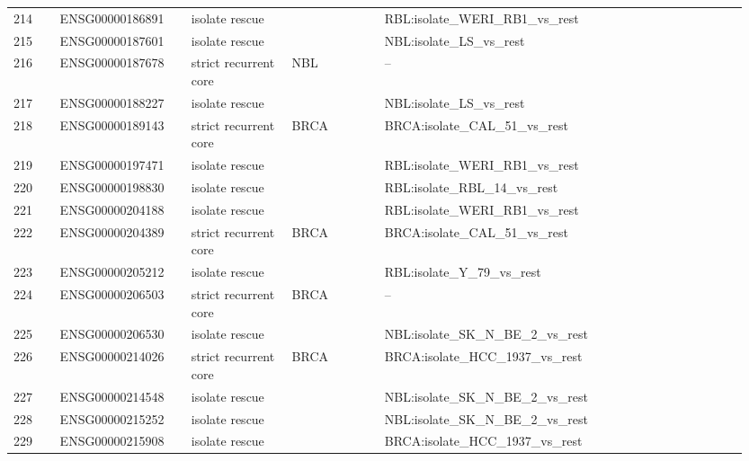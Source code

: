 \begin{landscape}
{\begin{longtable}{p{0.06\linewidth}p{0.17\linewidth}p{0.13\linewidth}p{0.12\linewidth}p{0.47\linewidth}}
214 & ENSG00000186891 & isolate rescue &  & RBL:isolate\_\allowbreak{}WERI\_\allowbreak{}RB1\_\allowbreak{}vs\_\allowbreak{}rest \\
215 & ENSG00000187601 & isolate rescue &  & NBL:isolate\_\allowbreak{}LS\_\allowbreak{}vs\_\allowbreak{}rest \\
216 & ENSG00000187678 & strict recurrent core & NBL & -- \\
217 & ENSG00000188227 & isolate rescue &  & NBL:isolate\_\allowbreak{}LS\_\allowbreak{}vs\_\allowbreak{}rest \\
218 & ENSG00000189143 & strict recurrent core & BRCA & BRCA:isolate\_\allowbreak{}CAL\_\allowbreak{}51\_\allowbreak{}vs\_\allowbreak{}rest \\
219 & ENSG00000197471 & isolate rescue &  & RBL:isolate\_\allowbreak{}WERI\_\allowbreak{}RB1\_\allowbreak{}vs\_\allowbreak{}rest \\
220 & ENSG00000198830 & isolate rescue &  & RBL:isolate\_\allowbreak{}RBL\_\allowbreak{}14\_\allowbreak{}vs\_\allowbreak{}rest \\
221 & ENSG00000204188 & isolate rescue &  & RBL:isolate\_\allowbreak{}WERI\_\allowbreak{}RB1\_\allowbreak{}vs\_\allowbreak{}rest \\
222 & ENSG00000204389 & strict recurrent core & BRCA & BRCA:isolate\_\allowbreak{}CAL\_\allowbreak{}51\_\allowbreak{}vs\_\allowbreak{}rest \\
223 & ENSG00000205212 & isolate rescue &  & RBL:isolate\_\allowbreak{}Y\_\allowbreak{}79\_\allowbreak{}vs\_\allowbreak{}rest \\
224 & ENSG00000206503 & strict recurrent core & BRCA & -- \\
225 & ENSG00000206530 & isolate rescue &  & NBL:isolate\_\allowbreak{}SK\_\allowbreak{}N\_\allowbreak{}BE\_\allowbreak{}2\_\allowbreak{}vs\_\allowbreak{}rest \\
226 & ENSG00000214026 & strict recurrent core & BRCA & BRCA:isolate\_\allowbreak{}HCC\_\allowbreak{}1937\_\allowbreak{}vs\_\allowbreak{}rest \\
227 & ENSG00000214548 & isolate rescue &  & NBL:isolate\_\allowbreak{}SK\_\allowbreak{}N\_\allowbreak{}BE\_\allowbreak{}2\_\allowbreak{}vs\_\allowbreak{}rest \\
228 & ENSG00000215252 & isolate rescue &  & NBL:isolate\_\allowbreak{}SK\_\allowbreak{}N\_\allowbreak{}BE\_\allowbreak{}2\_\allowbreak{}vs\_\allowbreak{}rest \\
229 & ENSG00000215908 & isolate rescue &  & BRCA:isolate\_\allowbreak{}HCC\_\allowbreak{}1937\_\allowbreak{}vs\_\allowbreak{}rest \\

\end{longtable}}
\end{landscape}
